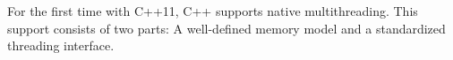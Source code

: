 
For the first time with C++11, C++ supports native multithreading. This support consists of two parts: A well-defined memory model and a standardized threading interface.

















































